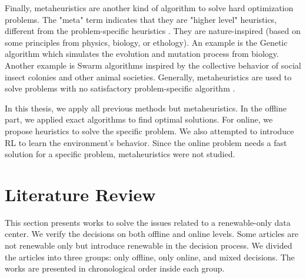 Finally, metaheuristics are another kind of algorithm to solve hard optimization problems. The "meta" term indicates that they are "higher level" heuristics, different from the problem-specific heuristics \cite{boussaid2013survey}. They are nature-inspired (based on some principles from physics, biology, or ethology). An example is the Genetic algorithm which simulates the evolution and mutation process from biology. Another example is Swarm algorithms inspired by the collective behavior of social insect colonies and other animal societies. Generally, metaheuristics are used to solve problems with no satisfactory problem-specific algorithm \cite{boussaid2013survey}.

In this thesis, we apply all previous methods but metaheuristics. In the offline part, we applied exact algorithms to find optimal solutions. For online, we propose heuristics to solve the specific problem. We also attempted to introduce RL to learn the environment's behavior. Since the online problem needs a fast solution for a specific problem, metaheuristics were not studied.

\section{Literature Review}
This section presents works to solve the issues related to a renewable-only data center. We verify the decisions on both offline and online levels. Some articles are not renewable only but introduce renewable in the decision process. We divided the articles into three groups: only offline, only online, and mixed decisions. The works are presented in chronological order inside each group.


